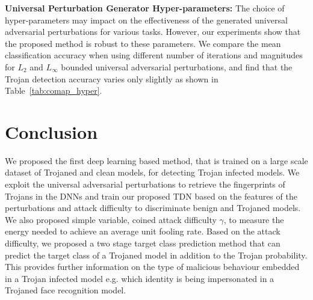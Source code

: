 \documentclass{article}
\begin{document}
{\bf  Universal Perturbation Generator Hyper-parameters:} The choice of hyper-parameters may impact on the effectiveness of the generated universal adversarial perturbations for various tasks. However, our experiments show that the proposed method is robust to these parameters. We compare the mean classification accuracy when using different number of iterations and magnitudes for $L_{2}$ and $L_{\infty}$ bounded universal adversarial perturbations, and find that the Trojan detection accuracy varies only slightly as shown in Table~\ref{tab:comap_hyper}. 



























\vspace{-3mm}
\section{Conclusion}
\vspace{-3mm}

We proposed the first deep learning based method, that is trained on a large scale dataset of Trojaned and clean models, for detecting Trojan infected models. 
We exploit the universal adversarial perturbations to retrieve the fingerprints of Trojans in the DNNs and train our proposed TDN based on the features of the perturbations and attack difficulty to discriminate benign and Trojaned models. We also proposed simple variable, coined attack difficulty $\gamma$, to measure the energy needed to achieve an average unit fooling rate. Based on the attack difficulty, we proposed a two stage target class prediction method that can predict the target class of a Trojaned model in addition to the Trojan probability. This provides further information on the type of malicious behaviour embedded in a Trojan infected model e.g. which identity is being impersonated in a Trojaned face recognition model.
\end{document}
